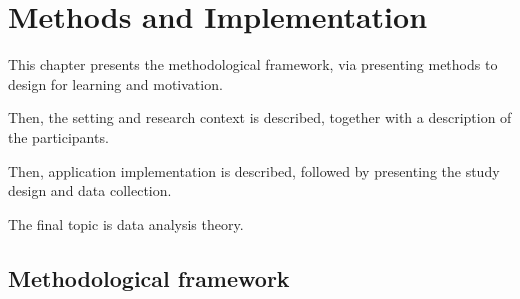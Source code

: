 \chapter{Methods and Implementation}\label{cha:Method}





This chapter presents the methodological framework, via presenting methods to design for learning and motivation.

Then, the setting and research context is described, together with a description of the participants.

Then, application implementation is described, followed by presenting the study design and data collection.

The final topic is data analysis theory.

\section{Methodological framework}













